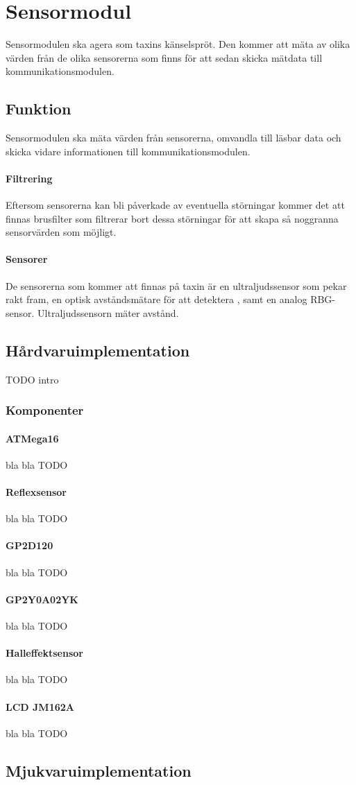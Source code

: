 \documentclass[designspec/spec.tex]{subfiles}
\begin{document}
\section{Sensormodul}
Sensormodulen ska agera som taxins känselspröt. Den kommer att mäta av olika
värden från de olika sensorerna som finns för att sedan skicka mätdata till
kommunikationsmodulen.

\subsection{Funktion}
Sensormodulen ska mäta värden från sensorerna, omvandla till läsbar data och
skicka vidare informationen till kommunikationsmodulen.

\paragraph{Filtrering}
Eftersom sensorerna kan bli påverkade av eventuella störningar kommer det att
finnas brusfilter som filtrerar bort dessa störningar för att skapa så
noggranna sensorvärden som möjligt.

\paragraph{Sensorer}
De sensorerna som kommer att finnas på taxin är en ultraljudssensor som pekar
rakt fram, en optisk avståndsmätare för att detektera , samt en analog RBG-sensor.
Ultraljudssensorn mäter avstånd.

\subsection{Hårdvaruimplementation} 
TODO intro

\subsubsection{Komponenter}
\paragraph{ATMega16} bla bla TODO
\paragraph{Reflexsensor} bla bla TODO
\paragraph{GP2D120} bla bla TODO
\paragraph{GP2Y0A02YK} bla bla TODO
\paragraph{Halleffektsensor} bla bla TODO
\paragraph{LCD JM162A} bla bla TODO

\subsection{Mjukvaruimplementation} 
\end{document}
